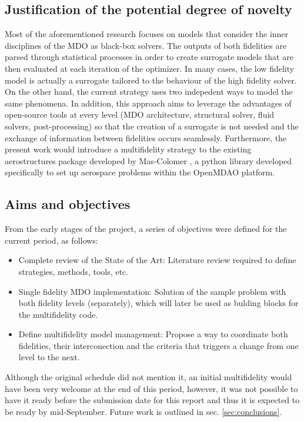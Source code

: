 \subsection{Justification of the potential degree of novelty}
Most of the aforementioned research focuses on models that consider the inner disciplines of the MDO as black-box solvers. The outputs of both fidelities are parsed through statistical processes in order to create surrogate models that are then evaluated at each iteration of the optimizer. In many cases, the low fidelity model is actually a surrogate tailored to the behaviour of the high fidelity solver. On the other hand, the current strategy uses two indepedent ways to model the same phenomena. In addition, this approach aims to leverage the advantages of open-source tools at every level (MDO architecture, structural solver, fluid solvers, post-processing) so that the creation of a surrogate is not needed and the exchange of information between fidelities occurs seamlessly. Furthermore, the present work would introduce a multifidelity strategy to the existing aerostructures package developed by Mas-Colomer \cite{mascolomer:tel-02023612}, a python library developed specifically to set up aerospace problems within the OpenMDAO platform.     
\subsection{Aims and objectives}
From the early stages of the project, a series of objectives were defined for the current period, as follows: 
\begin{itemize}
    \item Complete review of the State of the Art: Literature review required to define strategies, methods, tools, etc.
    \item Single fidelity MDO implementation: Solution of the sample problem with both fidelity levels (separately), which will later be used as bulding blocks for the multifidelity code.
    \item Define multifidelity model management: Propose a way to coordinate both fidelities, their interconection and the criteria that triggers a change from one level to the next. 
\end{itemize}
Although the original schedule did not mention it, an initial multifidelity would have been very welcome at the end of this period, however, it was not possible to have it ready before the submission date for this report and thus it is expected to be ready by mid-September. Future work is outlined in sec. \ref{sec:conclusions}.

